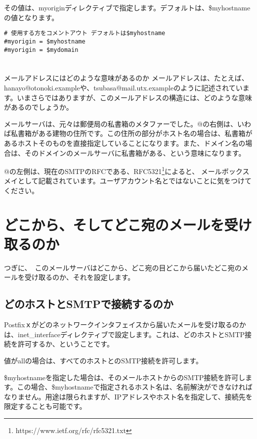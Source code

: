 その値は、myoriginディレクティブで指定します。デフォルトは、\$myhostnameの値となります。

\begin{lstlisting}[basicstyle=\ttfamily\footnotesize, frame=single]
# 使用する方をコメントアウト デフォルトは$myhostname
#myorigin = $myhostname
#myorigin = $mydomain
\end{lstlisting}

\section*{}
\begin{itembox}[l]{メールアドレスにはどのような意味があるのか}
メールアドレスは、たとえば、hanayo@otonoki.exampleや、tsubasa@mail.utx.exampleのように記述されています。いまさらではありますが、このメールアドレスの構造には、どのような意味があるのでしょうか。

メールサーバは、元々は郵便局の私書箱のメタファーでした。@の右側は、いわば私書箱がある建物の住所です。この住所の部分がホスト名の場合は、私書箱があるホストそのものを直接指定していることになります。また、ドメイン名の場合は、そのドメインのメールサーバに私書箱がある、という意味になります。

@の左側は、現在のSMTPのRFCである、RFC5321\footnote{https://www.ietf.org/rfc/rfc5321.txt}によると、
メールボックスメイとして記載されています。ユーザアカウント名とではないことに気をつけてください。
\end{itembox}


\section{どこから、そしてどこ宛のメールを受け取るのか}

つぎに、　このメールサーバはどこから、どこ宛の目どこから届いたどこ宛のメールを受け取るのか、それを設定します。

\subsection{どのホストとSMTPで接続するのか}

Postfixｘがどのネットワークインタフェイスから届いたメールを受け取るのかは、inet\_interfaceディレクティブで設定します。これは、どのホストとSMTP接続を許可するか、ということです。

値がallの場合は、すべてのホストとのSMTP接続を許可します。

\$myhostnameを指定した場合は、そのメールホストからのSMTP接続を許可します。この場合、\$myhostnameで指定されるホスト名は、名前解決ができなければなりません。用途は限られますが、IPアドレスやホスト名を指定して、接続先を限定することも可能です。

